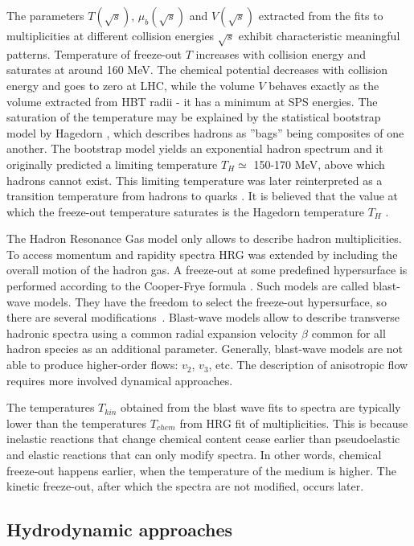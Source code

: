 The parameters $T(\sqrt{s})$, $\mu_b(\sqrt{s})$ and $V(\sqrt{s})$ extracted
from the fits to multiplicities at different collision energies $\sqrt{s}$
exhibit characteristic meaningful patterns.  Temperature of freeze-out $T$
increases with collision energy and saturates at around 160 MeV.
The chemical potential decreases with collision energy and goes to zero at LHC,
while the volume $V$ behaves exactly as the volume extracted from HBT radii - it
has a minimum at SPS energies. The saturation of the temperature may be explained
by the statistical bootstrap model by Hagedorn
\cite{Rafelski:2016hnq,Hagedorn:1965st}, which describes hadrons as ''bags''
being composites of one another. The bootstrap model yields an exponential hadron
spectrum and it originally predicted a limiting temperature $T_H \simeq $
150-170 MeV, above which hadrons cannot exist. This limiting
temperature was later reinterpreted as a transition temperature from hadrons to
quarks \cite{Cabibbo:1975ig}. It is believed that the value at which the freeze-out
temperature saturates is the Hagedorn temperature $T_H$ \cite{Andronic:2005yp}.

The Hadron Resonance Gas model only allows to describe hadron multiplicities. To
access momentum and rapidity spectra HRG was extended by including the overall
motion of the hadron gas. A freeze-out at some predefined hypersurface is
performed according to the Cooper-Frye formula \cite{Cooper:1974mv}. Such
models are called blast-wave models. They have the freedom to select the
freeze-out hypersurface, so there are several
modifications~\cite{Siemens:1978pb,Schnedermann:1993ws,Chojnacki:2011hb}.
Blast-wave models allow to describe transverse hadronic spectra using a common
radial expansion velocity $\beta$ common for all hadron species as an additional parameter.
Generally, blast-wave models are not able to produce higher-order flows: $v_2$,
$v_3$, etc. The description of anisotropic flow requires more involved dynamical approaches.

The temperatures $T_{kin}$ obtained from the blast wave fits to spectra are
typically lower than the temperatures $T_{chem}$ from HRG fit of multiplicities.
This is because inelastic reactions that change chemical content cease earlier than
pseudoelastic and elastic reactions that can only modify spectra. In other words,
chemical freeze-out happens earlier, when the temperature of the medium is higher.
The kinetic freeze-out, after which the spectra are not modified, occurs later.

\subsection{Hydrodynamic approaches} \label{sec:hydro_appr}

